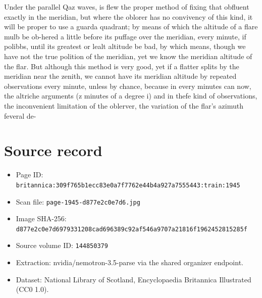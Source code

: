 \documentclass{article}
\begin{document}
Under the parallel Qaz waves, is flew the proper method of fixing that obfluent exactly in the meridian, but where the oblorer has no convivency of this kind, it will be proper to use a guarda quadrant; by means of which the altitude of a flare mulb be ob-hered a little before its puffage over the meridian, every minute, if polibbs, until its greatest or lealt altitude be bad, by which means, though we have not the true polition of the meridian, yet we know the meridian altitude of the flar. But although this method is very good, yet if a flatter splits by the meridian near the zenith, we cannot have its meridian altitude by repeated observations every minute, unless by chance, because in every minutes can now, the altriche arguments (z minutes of a degree i) and in thefe kind of observations, the inconvenient limitation of the oblerver, the variation of the flar's azimuth feveral de-

\section*{Source record}
\begin{itemize}
\item Page ID: \texttt{britannica:309f765b1ecc83e0a7f7762e44b4a927a7555443:train:1945}
\item Scan file: \texttt{page-1945-d877e2c0e7d6.jpg}
\item Image SHA-256: \texttt{d877e2c0e7d6979331208cad696389c92af546a9707a21816f1962452815285f}
\item Source volume ID: \texttt{144850379}
\item Extraction: nvidia/nemotron-3.5-parse via the shared organizer endpoint.
\item Dataset: National Library of Scotland, Encyclopaedia Britannica Illustrated (CC0 1.0).
\end{itemize}
\end{document}
